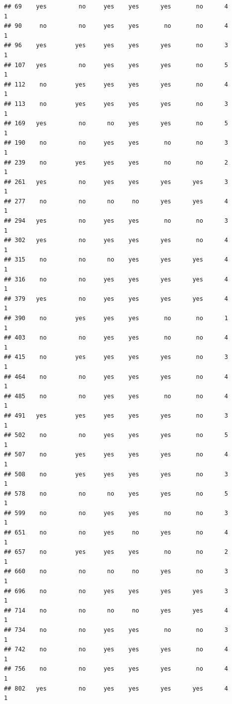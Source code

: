 \documentclass[]{article}
\begin{document}
\begin{verbatim}
## 69    yes         no     yes    yes      yes       no      4        1
## 90     no         no     yes    yes       no       no      4        1
## 96    yes        yes     yes    yes      yes       no      3        1
## 107   yes         no     yes    yes      yes       no      5        1
## 112    no        yes     yes    yes      yes       no      4        1
## 113    no        yes     yes    yes      yes       no      3        1
## 169   yes         no      no    yes      yes       no      5        1
## 190    no         no     yes    yes       no       no      3        1
## 239    no        yes     yes    yes       no       no      2        1
## 261   yes         no     yes    yes      yes      yes      3        1
## 277    no         no      no     no      yes      yes      4        1
## 294   yes         no     yes    yes       no       no      3        1
## 302   yes         no     yes    yes      yes       no      4        1
## 315    no         no      no    yes      yes      yes      4        1
## 316    no         no     yes    yes      yes      yes      4        1
## 379   yes         no     yes    yes      yes      yes      4        1
## 390    no        yes     yes    yes       no       no      1        1
## 403    no         no     yes    yes       no       no      4        1
## 415    no        yes     yes    yes      yes       no      3        1
## 464    no         no     yes    yes      yes       no      4        1
## 485    no         no     yes    yes       no       no      4        1
## 491   yes        yes     yes    yes      yes       no      3        1
## 502    no         no     yes    yes      yes       no      5        1
## 507    no        yes     yes    yes      yes       no      4        1
## 508    no        yes     yes    yes      yes       no      3        1
## 578    no         no      no    yes      yes       no      5        1
## 599    no         no     yes    yes       no       no      3        1
## 651    no         no     yes     no      yes       no      4        1
## 657    no        yes     yes    yes       no       no      2        1
## 660    no         no      no     no      yes       no      3        1
## 696    no         no     yes    yes      yes      yes      3        1
## 714    no         no      no     no      yes      yes      4        1
## 734    no         no     yes    yes       no       no      3        1
## 742    no         no     yes    yes      yes       no      4        1
## 756    no         no     yes    yes      yes       no      4        1
## 802   yes         no     yes    yes      yes      yes      4        1

\end{verbatim}
\end{document}
